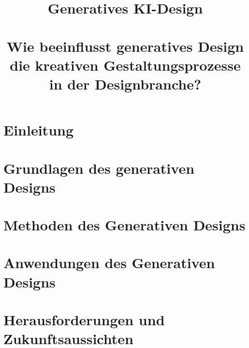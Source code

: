 \documentclass[conference]{IEEEtran}
\begin{document}
\title{Generatives KI-Design\\
\large \ \\ \large Wie beeinflusst generatives Design die kreativen Gestaltungsprozesse in der Designbranche?}

\author{

  \and

}

\maketitle

\thispagestyle{plain} %
\pagestyle{plain} %
\setcounter{page}{1} %



\section{Einleitung}


\section{Grundlagen des generativen Designs}


\section{Methoden des Generativen Designs}


\section{Anwendungen des Generativen Designs}


\section{Herausforderungen und Zukunftsaussichten}

\end{document}
